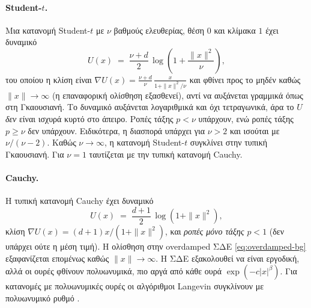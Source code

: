 \paragraph{Student-$t$.}
Μια κατανομή Student-$t$ με $\nu$ βαθμούς ελευθερίας, θέση $0$ και κλίμακα $1$
έχει δυναμικό
\begin{equation}
  U(x) \;=\; \frac{\nu + d}{2}\, \log\!\left(1 + \frac{\|x\|^2}{\nu}\right),
\end{equation}
του οποίου η κλίση είναι $\nabla U(x) = \frac{\nu+d}{\nu}\,\frac{x}{1 + \|x\|^2/\nu}$
και φθίνει προς το μηδέν καθώς $\|x\| \to \infty$ (η επαναφορική ολίσθηση
εξασθενεί), αντί να αυξάνεται γραμμικά όπως στη Γκαουσιανή. Το δυναμικό
αυξάνεται λογαριθμικά και όχι τετραγωνικά, άρα το $U$
\emph{δεν} είναι ισχυρά κυρτό στο άπειρο. Ροπές τάξης $p < \nu$ υπάρχουν,
ενώ ροπές τάξης $p \geq \nu$ δεν υπάρχουν. Ειδικότερα, η διασπορά
υπάρχει για $\nu > 2$ και ισούται με $\nu / (\nu - 2)$. Καθώς $\nu \to \infty$, η
κατανομή Student-$t$ συγκλίνει στην τυπική Γκαουσιανή. Για $\nu = 1$ ταυτίζεται
με την τυπική κατανομή Cauchy.

\paragraph{Cauchy.}
Η τυπική κατανομή Cauchy έχει δυναμικό
\begin{equation}
  U(x) \;=\; \frac{d+1}{2}\, \log\!\left(1 + \|x\|^2\right),
\end{equation}
κλίση $\nabla U(x) = (d+1) x / (1 + \|x\|^2)$, και \emph{ροπές μόνο τάξης $p < 1$}
(δεν υπάρχει ούτε η μέση τιμή). Η ολίσθηση στην overdamped ΣΔΕ \eqref{eq:overdamped-bg}
εξαφανίζεται επομένως καθώς $\|x\| \to \infty$. Η ΣΔΕ εξακολουθεί να είναι
εργοδική, αλλά οι ουρές φθίνουν πολυωνυμικά, πιο αργά από κάθε ουρά
$\exp(-c|x|^\beta)$. Για κατανομές με πολυωνυμικές ουρές οι αλγόριθμοι Langevin
συγκλίνουν με πολυωνυμικό ρυθμό \citep{jarner2007convergence}.

